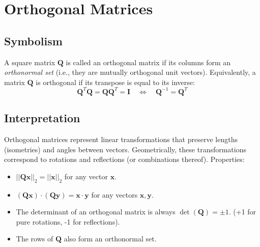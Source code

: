\documentclass{article}
\newcommand{\vect}[1]{\bm{#1}} %
\newcommand{\mat}[1]{\bm{#1}}  %
\begin{document}
\section{Orthogonal Matrices}

\subsection*{Symbolism}
A square matrix $\mat{Q}$ is called an orthogonal matrix if its columns form an \emph{orthonormal set} (i.e., they are mutually orthogonal unit vectors). Equivalently, a matrix $\mat{Q}$ is orthogonal if its transpose is equal to its inverse:
\[ \mat{Q}^T \mat{Q} = \mat{Q} \mat{Q}^T = \mat{I} \quad \iff \quad \mat{Q}^{-1} = \mat{Q}^T \]

\subsection*{Interpretation}
Orthogonal matrices represent linear transformations that preserve lengths (isometries) and angles between vectors. Geometrically, these transformations correspond to rotations and reflections (or combinations thereof).
Properties:
\begin{itemize}
    \item $||\mat{Q}\vect{x}||_2 = ||\vect{x}||_2$ for any vector $\vect{x}$.
    \item $(\mat{Q}\vect{x}) \cdot (\mat{Q}\vect{y}) = \vect{x} \cdot \vect{y}$ for any vectors $\vect{x}, \vect{y}$.
    \item The determinant of an orthogonal matrix is always $\det(\mat{Q}) = \pm 1$. (+1 for pure rotations, -1 for reflections).
    \item The rows of $\mat{Q}$ also form an orthonormal set.
\end{itemize}
\end{document}
